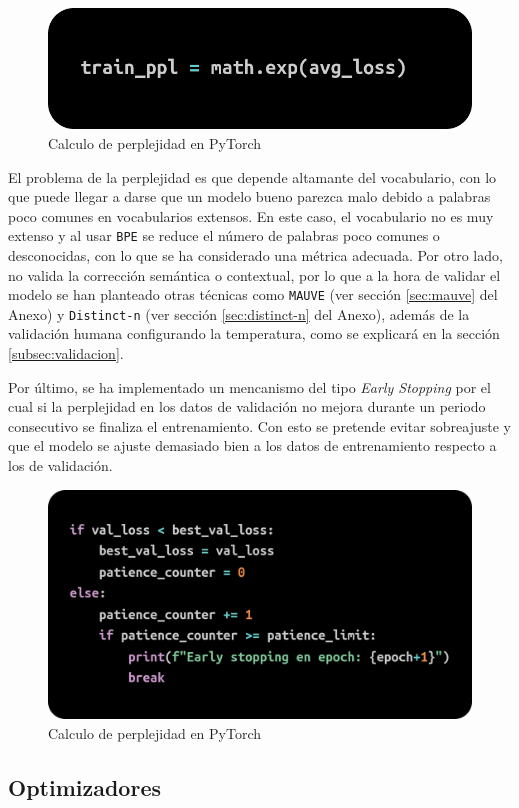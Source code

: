 \documentclass[11pt]{book}
\theoremstyle{plain}
\theoremstyle{definition}
\begin{document}
\begin{figure}[h]
    \centering
    \includegraphics[width=0.5\linewidth]{img/perplexity.png}
    \caption{Calculo de perplejidad en PyTorch \parencite{stackoverflow_perplexity_pytorch}}
    \label{fig:placeholder21}
\end{figure}

El problema de la perplejidad \parencite{singh2024perplexitymatters} es que depende altamante del vocabulario, con lo que puede llegar a darse que un modelo bueno parezca malo debido a palabras poco comunes en vocabularios extensos. En este caso, el vocabulario no es muy extenso y al usar \texttt{BPE} se reduce el número de palabras poco comunes o desconocidas, con lo que se ha considerado una métrica adecuada. Por otro lado, no valida la corrección semántica o contextual, por lo que a la hora de validar el modelo se han planteado otras técnicas como \texttt{MAUVE} \parencite{krishnap25_mauve_github} (ver sección \ref{sec:mauve} del Anexo) y \texttt{Distinct-n} (ver sección \ref{sec:distinct-n} del Anexo), además de la validación humana configurando la temperatura, como se explicará en la sección \ref{subsec:validacion}.

Por último, se ha implementado un mencanismo del tipo \textit{Early Stopping} por el cual si la perplejidad en los datos de validación no mejora durante un periodo consecutivo se finaliza el entrenamiento. Con esto se pretende evitar sobreajuste y que el modelo se ajuste demasiado bien a los datos de entrenamiento respecto a los de validación.

\begin{figure}[h]
    \centering
    \includegraphics[width=0.5\linewidth]{img/early_stop.png}
    \caption{Calculo de perplejidad en PyTorch \parencite{stackoverflow_perplexity_pytorch}}
    \label{fig:placeholder23}
\end{figure}

\subsection{Optimizadores}
\end{document}
